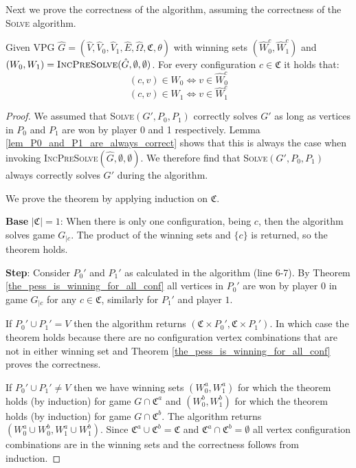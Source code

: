Next we prove the correctness of the algorithm, assuming the correctness of the \textsc{Solve} algorithm.
\begin{theorem}
	Given VPG $\hat{G} = (\hat{V},\hat{V}_0,\hat{V}_1,\hat{E},\hat{\Omega},\mathfrak{C},\theta)$ with winning sets $(\hat{W}_0^c, \hat{W}_1^c)$ and $(W_0,W_1) = \textsc{IncPreSolve}(\hat{G},\emptyset,\emptyset)$. For every configuration $c \in \mathfrak{C}$ it holds that:
	\[ (c,v) \in W_0 \iff v \in \hat{W}_0^c \]
	\[ (c,v) \in W_1 \iff v \in \hat{W}_1^c \]
	\begin{proof}
		We assumed that \textsc{Solve}$(G',P_0,P_1)$ correctly solves $G'$ as long as vertices in $P_0$ and $P_1$ are won by player 0 and 1 respectively. Lemma \ref{lem_P0_and_P1_are_always_correct} shows that this is always the case when invoking \textsc{IncPreSolve}$(\hat{G},\emptyset,\emptyset)$. We therefore find that \textsc{Solve}$(G',P_0,P_1)$ always correctly solves $G'$ during the algorithm.
		
		We prove the theorem by applying induction on $\mathfrak{C}$.
		
		\textbf{Base} $|\mathfrak{C}| = 1$: When there is only one configuration, being $c$, then the algorithm solves game $G_{|c}$. The product of the winning sets and $\{c\}$ is returned, so the theorem holds.
		
		\textbf{Step}: Consider $P_0'$ and $P_1'$ as calculated in the algorithm (line 6-7). By Theorem \ref{the_pess_is_winning_for_all_conf} all vertices in $P_0'$ are won by player $0$ in game $G_{|c}$ for any $c \in \mathfrak{C}$, similarly for $P_1'$ and player $1$.
		
		If $P_0' \cup P_1' = V$ then the algorithm returns $(\mathfrak{C} \times P_0',\mathfrak{C} \times P_1')$. In which case the theorem holds because there are no configuration vertex combinations that are not in either winning set and Theorem \ref{the_pess_is_winning_for_all_conf} proves the correctness.
		
		If $P_0' \cup P_1' \neq V$ then we have winning sets $(W_0^a, W_1^a)$ for which the theorem holds (by induction) for game $G \cap \mathfrak{C}^a$ and $(W_0^b, W_1^b)$ for which the theorem holds (by induction) for game $G \cap \mathfrak{C}^b$. The algorithm returns $(W_0^a \cup W_0^b, W_1^a \cup W_1^b)$. Since $\mathfrak{C}^a \cup \mathfrak{C}^b = \mathfrak{C}$ and $\mathfrak{C}^a \cap \mathfrak{C}^b = \emptyset$ all vertex configuration combinations are in the winning sets and the correctness follows from induction.
	\end{proof}
\end{theorem}

